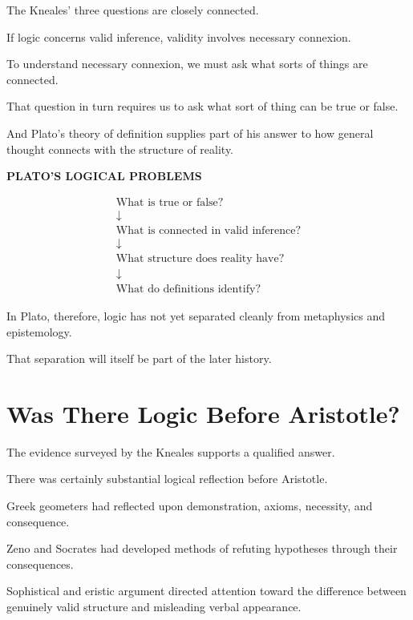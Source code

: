 \documentclass[11pt]{article}
\begin{document}
The Kneales' three questions are closely connected.

If logic concerns valid inference, validity involves necessary
connexion.

To understand necessary connexion, we must ask what sorts of
things are connected.

That question in turn requires us to ask what sort of thing can
be true or false.

And Plato's theory of definition supplies part of his answer to
how general thought connects with the structure of reality.
\newpage

\begin{whiteboard}
\textbf{PLATO'S LOGICAL PROBLEMS}

\[
\begin{array}{c}
\text{What is true or false?}\\
\downarrow\\
\text{What is connected in valid inference?}\\
\downarrow\\
\text{What structure does reality have?}\\
\downarrow\\
\text{What do definitions identify?}
\end{array}
\]
\end{whiteboard}

In Plato, therefore, logic has not yet separated cleanly from
metaphysics and epistemology.

That separation will itself be part of the later history.

\section{Was There Logic Before Aristotle?}

The evidence surveyed by the Kneales supports a qualified answer.

There was certainly substantial logical reflection before
Aristotle.

Greek geometers had reflected upon demonstration, axioms,
necessity, and consequence.

Zeno and Socrates had developed methods of refuting hypotheses
through their consequences.

Sophistical and eristic argument directed attention toward the
difference between genuinely valid structure and misleading
verbal appearance.
\end{document}
